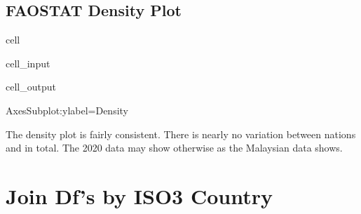 \documentclass[letterpaper,10pt,english]{jupyterBook}
\begin{document}
\subsection{FAOSTAT Density Plot}
\label{\detokenize{notebooks/data_exploration:faostat-density-plot}}
\begin{sphinxuseclass}{cell}\begin{sphinxVerbatimInput}

\begin{sphinxuseclass}{cell_input}
\begin{sphinxVerbatim}[commandchars=\\\{\}]
       \PYG{p}{[}    \PYG{p}{]}    
\end{sphinxVerbatim}

\end{sphinxuseclass}\end{sphinxVerbatimInput}
\begin{sphinxVerbatimOutput}

\begin{sphinxuseclass}{cell_output}
\begin{sphinxVerbatim}[commandchars=\\\{\}]
\PYGZlt{}AxesSubplot:ylabel=\PYGZsq{}Density\PYGZsq{}\PYGZgt{}
\end{sphinxVerbatim}

\noindent{}

\end{sphinxuseclass}\end{sphinxVerbatimOutput}

\end{sphinxuseclass}
\sphinxAtStartPar
The density plot is fairly consistent.  There is nearly no variation between nations and in total.  The 2020 data may show otherwise as the Malaysian data shows.


\section{Join Df’s by ISO3 Country}
\label{\detokenize{notebooks/data_exploration:join-df-s-by-iso3-country}}
\end{document}
